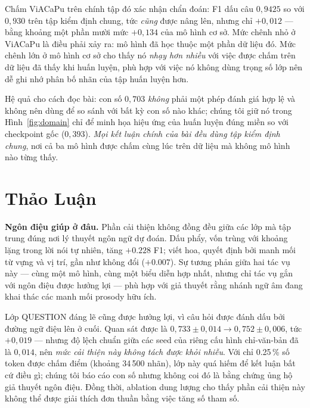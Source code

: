 \documentclass[conference,onecolumn]{IEEEtran}
\begin{document}
Chấm ViACaPu trên chính tập đó xác nhận chẩn đoán: F1 dấu câu $0{,}9425$ so
với $0{,}930$ trên tập kiểm định chung, tức \emph{cũng} được nâng lên, nhưng
chỉ $+0{,}012$ --- bằng khoảng một phần mười mức $+0{,}134$ của mô hình cơ sở.
Mức chênh nhỏ ở ViACaPu là điều phải xảy ra: mô hình đã học thuộc một phần dữ
liệu đó. Mức chênh lớn ở mô hình cơ sở cho thấy nó \emph{nhạy hơn nhiều} với
việc được chấm trên dữ liệu đã thấy khi huấn luyện, phù hợp với việc nó không
dùng trọng số lớp nên dễ ghi nhớ phân bố nhãn của tập huấn luyện hơn.

Hệ quả cho cách đọc bài: con số $0{,}703$ \emph{không} phải một phép đánh giá
hợp lệ và không nên dùng để so sánh với bất kỳ con số nào khác; chúng tôi giữ
nó trong Hình~\ref{fig:domain} chỉ để minh họa hiệu ứng của huấn luyện đúng
miền so với checkpoint gốc ($0{,}393$). \emph{Mọi kết luận chính của bài đều
dùng tập kiểm định chung}, nơi cả ba mô hình được chấm cùng lúc trên dữ liệu
mà không mô hình nào từng thấy.

\section{Thảo Luận}

\textbf{Ngôn điệu giúp ở đâu.} Phần cải thiện không đồng đều giữa các lớp mà tập
trung đúng nơi lý thuyết ngôn ngữ dự đoán. Dấu phẩy, vốn trùng với khoảng lặng
trong lời nói tự nhiên, tăng $+0.228$ F1; viết hoa, quyết định bởi manh mối từ
vựng và vị trí, gần như không đổi ($+0.007$). Sự tương phản giữa hai tác vụ này
--- cùng một mô hình, cùng một biểu diễn hợp nhất, nhưng chỉ tác vụ gắn với ngôn
điệu được hưởng lợi --- phù hợp với giả thuyết rằng nhánh ngữ âm đang khai thác
các manh mối prosody hữu ích.

Lớp QUESTION đáng lẽ cũng được hưởng lợi, vì câu hỏi được đánh dấu bởi đường ngữ
điệu lên ở cuối. Quan sát được là $0{,}733\pm0{,}014 \rightarrow 0{,}752\pm0{,}006$,
tức $+0{,}019$ --- nhưng độ lệch chuẩn giữa các seed của riêng cấu hình
chỉ-văn-bản đã là $0{,}014$, nên \emph{mức cải thiện này không tách được khỏi
nhiễu}. Với chỉ 0.25\,\% số token được chấm điểm (khoảng 34\,500 nhãn), lớp này
quá hiếm để kết luận bất cứ điều gì; chúng tôi báo cáo con số nhưng không coi
đó là bằng chứng ủng hộ giả thuyết ngôn điệu. Đồng thời, ablation dung lượng cho thấy phần cải thiện này không
thể được giải thích đơn thuần bằng việc tăng số tham số.
\end{document}
